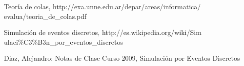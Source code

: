 \documentclass[10pt,journal,compsoc]{IEEEtran}
\begin{document}
\begin{thebibliography}{1}

Teor\'ia de colas, http://exa.unne.edu.ar/depar/areas/informatica/ evalua/teoria\_de\_colas.pdf

Simulaci\'on de eventos discretos, http://es.wikipedia.org/wiki/Sim ulaci\%C3\%B3n\_por\_eventos\_discretos

Diaz, Alejandro: Notas de Clase Curso 2009, Simulaci\'on por Eventos Discretos


\end{thebibliography}
\end{document}
